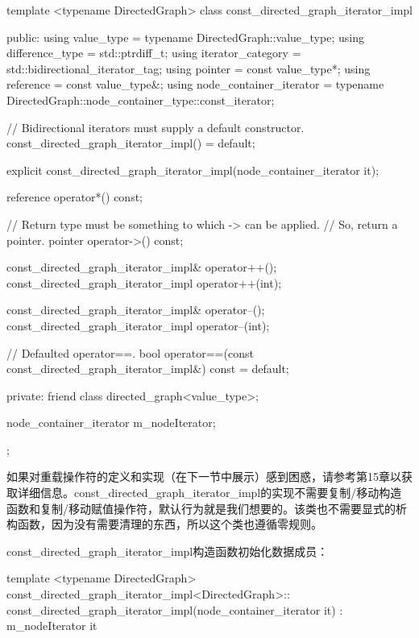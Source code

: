 \begin{cpp}
template <typename DirectedGraph>
class const_directed_graph_iterator_impl
{
    public:
        using value_type = typename DirectedGraph::value_type;
        using difference_type = std::ptrdiff_t;
        using iterator_category = std::bidirectional_iterator_tag;
        using pointer = const value_type*;
        using reference = const value_type&;
        using node_container_iterator =
            typename DirectedGraph::node_container_type::const_iterator;

        // Bidirectional iterators must supply a default constructor.
        const_directed_graph_iterator_impl() = default;

        explicit const_directed_graph_iterator_impl(node_container_iterator it);

        reference operator*() const;

        // Return type must be something to which -> can be applied.
        // So, return a pointer.
        pointer operator->() const;

        const_directed_graph_iterator_impl& operator++();
        const_directed_graph_iterator_impl operator++(int);

        const_directed_graph_iterator_impl& operator--();
        const_directed_graph_iterator_impl operator--(int);

        // Defaulted operator==.
        bool operator==(const const_directed_graph_iterator_impl&) const = default;

    private:
        friend class directed_graph<value_type>;

        node_container_iterator m_nodeIterator;
};
\end{cpp}

如果对重载操作符的定义和实现（在下一节中展示）感到困惑，请参考第15章以获取详细信息。const\_directed\_graph\_iterator\_impl的实现不需要复制/移动构造函数和复制/移动赋值操作符，默认行为就是我们想要的。该类也不需要显式的析构函数，因为没有需要清理的东西，所以这个类也遵循零规则。


const\_directed\_graph\_iterator\_impl构造函数初始化数据成员：

\begin{cpp}
template <typename DirectedGraph>
const_directed_graph_iterator_impl<DirectedGraph>::
    const_directed_graph_iterator_impl(node_container_iterator it)
        : m_nodeIterator { it } { }
\end{cpp}

